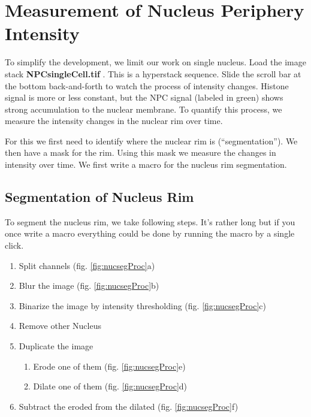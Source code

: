 \section{Measurement of Nucleus Periphery Intensity}

To simplify the development, we limit our work on single nucleus. Load the image stack \textbf{NPCsingleCell.tif} . This is a hyperstack sequence. Slide the scroll bar at the bottom back-and-forth to watch the process of intensity changes. Histone signal is more or less constant, but the NPC signal (labeled in green) shows strong accumulation to the nuclear membrane. To quantify this process, we measure the intensity changes in the nuclear rim over time.

For this we first need to identify where the nuclear rim is (``segmentation''). We then have a mask for the rim. Using this mask we measure the changes in intensity over time. We first write a macro for the nucleus rim segmentation.

\subsection{Segmentation of Nucleus Rim}

To segment the nucleus rim, we take following steps. It's rather long but if you once write a macro everything could be done by running the macro by a single click.

\begin{enumerate}
  \item Split channels (fig. \ref{fig:nucsegProc}a)
  \item Blur the image (fig. \ref{fig:nucsegProc}b)
  \item Binarize the image by intensity thresholding (fig. \ref{fig:nucsegProc}c)
  \item Remove other Nucleus
  \item Duplicate the image
  \begin{enumerate}
    \item Erode one of them (fig. \ref{fig:nucsegProc}e)
    \item Dilate one of them (fig. \ref{fig:nucsegProc}d)
  \end{enumerate}
  \item Subtract the eroded from the dilated (fig. \ref{fig:nucsegProc}f)
\end{enumerate}